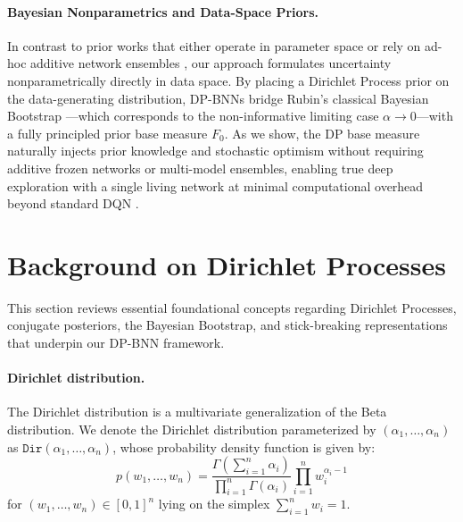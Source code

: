 \documentclass[10pt]{article}
\newcommand{\Dir}{\texttt{Dir}}
\begin{document}
\paragraph{Bayesian Nonparametrics and Data-Space Priors.}
In contrast to prior works that either operate in parameter space \citep{blundell2015weight} or rely on ad-hoc additive network ensembles \citep{osband2018randomized}, our approach formulates uncertainty nonparametrically directly in data space. By placing a Dirichlet Process prior on the data-generating distribution, DP-BNNs bridge Rubin's classical Bayesian Bootstrap \citep{rubin1981bayesian}---which corresponds to the non-informative limiting case $\alpha \to 0$---with a fully principled prior base measure $F_0$. As we show, the DP base measure naturally injects prior knowledge and stochastic optimism without requiring additive frozen networks or multi-model ensembles, enabling true deep exploration with a single living network at minimal computational overhead beyond standard DQN \citep{mnih2015human}.



\section{Background on Dirichlet Processes}
\label{sec:Background-DP}

This section reviews essential foundational concepts regarding Dirichlet Processes, conjugate posteriors, the Bayesian Bootstrap, and stick-breaking representations that underpin our DP-BNN framework.

\paragraph{Dirichlet distribution.}
The Dirichlet distribution is a multivariate generalization of the Beta distribution. We denote the Dirichlet distribution parameterized by $(\alpha_{1}, \dots, \alpha_{n})$ as $\Dir(\alpha_{1}, \dots, \alpha_{n})$, whose probability density function is given by:
\begin{equation}
p(w_1, \dots, w_n) = \frac{\Gamma(\sum_{i=1}^{n}\alpha_i)}{\prod_{i=1}^{n}\Gamma(\alpha_i)} \prod_{i=1}^{n}w_{i}^{\alpha_i-1}
\end{equation}
for $(w_{1}, \dots, w_{n}) \in [0,1]^{n}$ lying on the simplex $\sum_{i=1}^{n}w_{i} = 1$.
\end{document}
